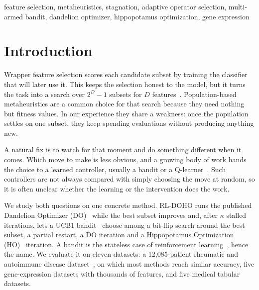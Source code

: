 \documentclass[journal]{IEEEtran}
\begin{document}
\begin{IEEEkeywords}
feature selection, metaheuristics, stagnation, adaptive operator selection, multi-armed bandit, dandelion optimizer, hippopotamus optimization, gene expression
\end{IEEEkeywords}

\section{Introduction}

Wrapper feature selection scores each candidate subset by training the classifier that will later use it. This keeps the selection honest to the model, but it turns the task into a search over $2^D-1$ subsets for $D$ features~\cite{kohavi1997,xue2016}. Population-based metaheuristics are a common choice for that search because they need nothing but fitness values. In our experience they share a weakness: once the population settles on one subset, they keep spending evaluations without producing anything new.

A natural fix is to watch for that moment and do something different when it comes. Which move to make is less obvious, and a growing body of work hands the choice to a learned controller, usually a bandit or a Q-learner~\cite{fialho2010,karafotias2015,hu2023rlgwo,hashjin2025q2ho}. Such controllers are not always compared with simply choosing the move at random, so it is often unclear whether the learning or the intervention does the work.

We study both questions on one concrete method. RL-DOHO runs the published Dandelion Optimizer (DO)~\cite{zhao2022do} while the best subset improves and, after $\kappa$ stalled iterations, lets a UCB1 bandit~\cite{auer2002} choose among a bit-flip search around the best subset, a partial restart, a DO iteration and a Hippopotamus Optimization (HO)~\cite{amiri2024ho} iteration. A bandit is the stateless case of reinforcement learning~\cite{sutton2018}, hence the name. We evaluate it on eleven datasets: a 12,085-patient rheumatic and autoimmune disease dataset~\cite{mahdi2025data}, on which most methods reach similar accuracy, five gene-expression datasets with thousands of features, and five medical tabular datasets.
\end{document}
